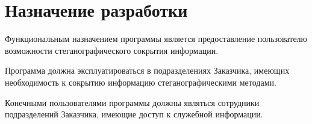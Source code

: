 \section{Назначение разработки}

Функциональным назначением программы является предоставление пользователю возможности стеганографического сокрытия информации.

Программа должна эксплуатироваться в подразделениях Заказчика, имеющих необходимость к сокрытию информацию стеганографическими методами.

Конечными пользователями программы должны являться сотрудники подразделений Заказчика, имеющие доступ к служебной информации.